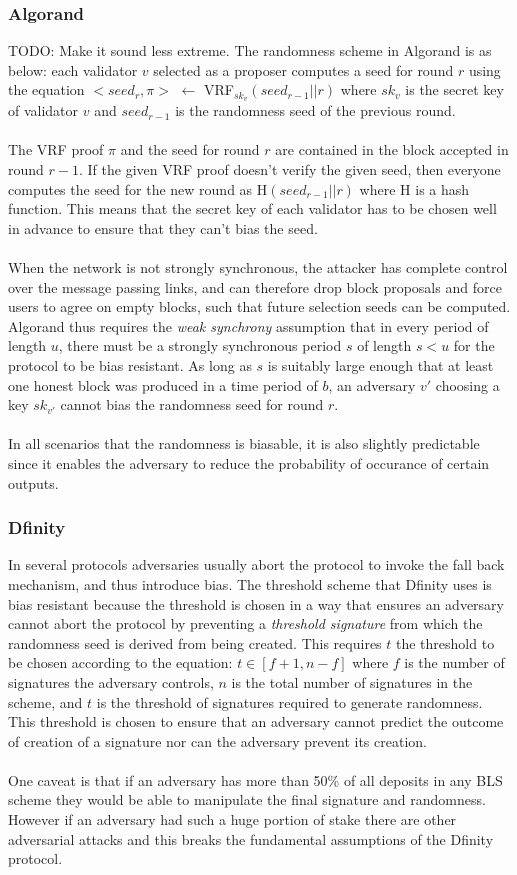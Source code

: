 \documentclass[10pt,journal,compsoc]{IEEEtran}
\begin{document}
\subsubsection{Algorand}
TODO: Make it sound less extreme. 
The randomness scheme in Algorand is as below:
each validator $v$ selected as a proposer computes a seed for round $r$ using the equation $< seed_r, \pi >$ $\leftarrow$ VRF$_{sk_{v}}(seed_{r-1}||r)$ where $sk_v$ is the secret key of validator $v$ and $seed_{r-1}$ is the randomness seed of the previous round.
\\\\    
The VRF proof $\pi$ and the seed for round $r$ are contained in the block accepted in round $r-1$. If the given VRF proof doesn't verify the given seed, then everyone computes the seed for the new round as H$(seed_{r-1}||r)$ where H is a hash function. This means that the secret key of each validator has to be chosen well in advance to ensure that they can't bias the seed.
\\\\
When the network is not strongly synchronous, the attacker has complete control over the message passing links, and can therefore drop block proposals and force users to agree on empty blocks, such that future selection seeds can be computed. Algorand thus requires the \emph{weak synchrony} assumption that in every period of length $u$, there must be a strongly synchronous period $s$ of length $s < u$ for the protocol to be bias resistant.  As long as $s$ is suitably large enough that at least one honest block was produced in a time period of $b$, an adversary $v'$ choosing a key $sk_{v'}$ cannot bias the randomness seed for round $r$. 
\\\\
In all scenarios that the randomness is biasable, it is also slightly predictable since it enables the adversary to reduce the probability of occurance of certain outputs. 
\subsubsection{Dfinity}
In several protocols adversaries usually abort the protocol to invoke the fall back mechanism, and thus introduce bias. The threshold scheme that Dfinity uses is bias resistant because the threshold is chosen in a way that ensures an adversary cannot abort the protocol by preventing a \emph{threshold signature} from which the randomness seed is derived from being created. This requires $t$ the threshold to be chosen according to the equation: 
$t \in [f+1, n-f]$ where $f$ is the number of signatures the adversary controls,  
$n$ is the total number of signatures in the scheme, and $t$ is the threshold of signatures required to generate randomness. This threshold is chosen to ensure that an adversary cannot predict the outcome of creation of a signature nor can the adversary prevent its creation. 
\\\\
One caveat is that if an adversary has more than 50\% of all deposits in any BLS scheme they would be able to manipulate the final signature and randomness. However if an adversary had such a huge portion of stake there are other adversarial attacks and this breaks the fundamental assumptions of the Dfinity protocol.
\end{document}
